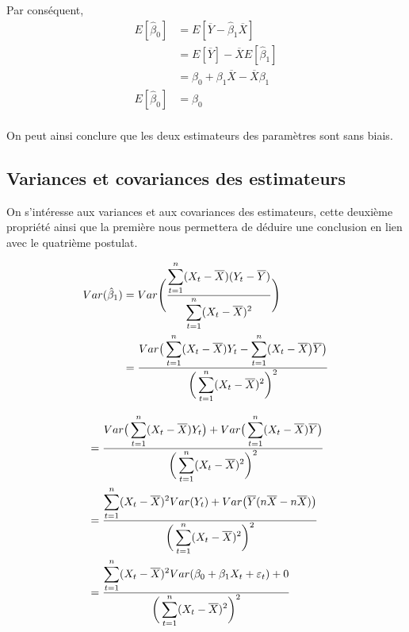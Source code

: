 \documentclass[11pt,french]{report}
\begin{document}
Par conséquent,
\begin{align*}
E[\hat{\beta}_0] &= E[\overline{Y} - \hat{\beta}_1 \overline{X}] \\
&= E[\overline{Y}] - \overline{X} E[\hat{\beta}_1]  \\
&= \beta_0 + \beta_1\overline{X} - \overline{X}\beta_1 \\
E[\hat{\beta}_0]  &= \beta_0 \\
\end{align*}

On peut ainsi conclure que les deux estimateurs des paramètres sont sans biais.

\subsection{Variances et covariances des estimateurs}
On s'intéresse aux variances et aux covariances des estimateurs, cette deuxième propriété ainsi que la première nous permettera de déduire une conclusion en lien avec le quatrième postulat.

\begin{align*}
Var(\hat{\beta}_1) &= Var\Bigg( \frac{\displaystyle\sum_{t=1}^n(X_t- \overline{X})(Y_t - \overline{Y})}{\displaystyle\sum_{t=1}^n(X_t - \overline{X})^2} \Bigg)\\
&= \frac{Var\big( \displaystyle\displaystyle\sum_{t=1}^n(X_t- \overline{X})Y_t - \displaystyle\sum_{t=1}^n(X_t- \overline{X} \big)\overline{Y}\big)}{\bigg( \displaystyle\sum_{t=1}^n(X_t - \overline{X})^2 \bigg)^2} \\
\end{align*}

\begin{align*}
&= \frac{Var\big( \displaystyle\sum_{t=1}^n(X_t- \overline{X})Y_t\big) + Var\big(\displaystyle\sum_{t=1}^n(X_t- \overline{X})\overline{Y}\big)}{\bigg( \displaystyle\displaystyle\sum_{t=1}^n(X_t - \overline{X})^2 \bigg)^2} \\
&= \frac{\displaystyle\sum_{t=1}^n(X_t- \overline{X})^2 Var(Y_t) + Var\big(\overline{Y}(n\overline{X}- n\overline{X})\big)}{\bigg( \displaystyle\sum_{t=1}^n(X_t - \overline{X})^2 \bigg)^2} \\
&= \frac{\displaystyle\sum_{t=1}^n(X_t- \overline{X})^2 Var(\beta_0 + \beta_1X_t + \varepsilon_t) + 0}{\bigg( \displaystyle\sum_{t=1}^n(X_t - \overline{X})^2 \bigg)^2} \\
\end{align*}
\end{document}
